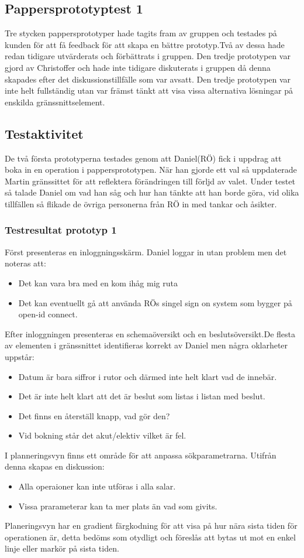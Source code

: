 \documentclass[a4paper,10pt]{article}
\begin{document}
\subsection{Pappersprototyptest 1}
Tre stycken pappersprototyper hade tagits fram av gruppen och testades på kunden för att få feedback för att skapa en bättre prototyp.Två av dessa hade redan tidigare utvärderats och förbättrats i gruppen. Den tredje prototypen var gjord av Christoffer och hade inte tidigare diskuterats i gruppen då denna skapades efter det diskussionstillfälle som var avsatt. Den tredje prototypen var inte helt fullständig utan var främst tänkt att visa vissa alternativa lösningar på enskilda gränssnittselement.
\subsection{Testaktivitet}
De två första prototyperna testades genom att Daniel(RÖ) fick i uppdrag att boka in en operation i pappersprototypen. När han gjorde ett val så uppdaterade Martin gränssittet för att reflektera förändringen till förljd av valet. Under testet så talade Daniel om vad han såg och hur han tänkte att han borde göra, vid olika tillfällen så flikade de övriga personerna från RÖ in med tankar och åsikter.
\subsubsection{Testresultat prototyp 1}
Först presenteras en inloggningsskärm. Daniel loggar in utan problem men det noteras att:
\begin{itemize}
  \item Det kan vara bra med en kom ihåg mig ruta
  \item Det kan eventuellt gå att använda RÖs singel sign on system som bygger på open-id connect.
\end{itemize}
Efter inloggningen presenteras en schemaöversikt och en beslutsöversikt.De flesta av elementen i gränssnittet identifieras korrekt av Daniel men några oklarheter uppstår:
\begin{itemize}
\item Datum är bara siffror i rutor och därmed inte helt klart vad de innebär.
\item Det är inte helt klart att det är beslut som listas i listan med beslut.
\item Det finns en återställ knapp, vad gör den?
\item Vid bokning står det akut/elektiv vilket är fel.
\end{itemize}
I planneringsvyn finns ett område för att anpassa sökparametrarna. Utifrån denna skapas en diskussion:
\begin{itemize}
\item Alla operaioner kan inte utföras i alla salar.
\item Vissa prarameterar kan ta mer plats än vad som givits.
\end{itemize}
Planeringsvyn har en gradient färgkodning för att visa på hur nära sista tiden för operationen är, detta bedöms som otydligt och föreslås att bytas ut mot en enkel linje eller markör på sista tiden.
\end{document}
